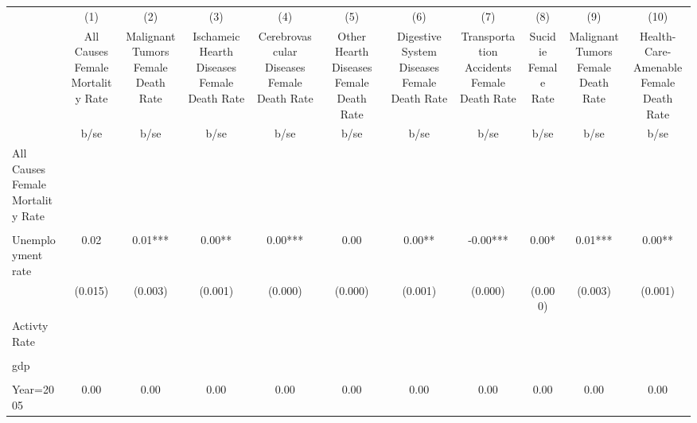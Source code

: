 {
\def\sym#1{\ifmmode^{#1}\else\(^{#1}\)\fi}
\begin{tabular}{l*{10}{c}}
\hline\hline
                    &\multicolumn{1}{c}{(1)}&\multicolumn{1}{c}{(2)}&\multicolumn{1}{c}{(3)}&\multicolumn{1}{c}{(4)}&\multicolumn{1}{c}{(5)}&\multicolumn{1}{c}{(6)}&\multicolumn{1}{c}{(7)}&\multicolumn{1}{c}{(8)}&\multicolumn{1}{c}{(9)}&\multicolumn{1}{c}{(10)}\\
                    &\multicolumn{1}{c}{All Causes Female Mortality Rate}&\multicolumn{1}{c}{Malignant Tumors Female Death Rate}&\multicolumn{1}{c}{Ischameic Hearth Diseases Female Death Rate}&\multicolumn{1}{c}{Cerebrovascular Diseases Female Death Rate}&\multicolumn{1}{c}{Other Hearth Diseases Female Death Rate}&\multicolumn{1}{c}{Digestive System Diseases Female Death Rate}&\multicolumn{1}{c}{Transportation Accidents Female Death Rate}&\multicolumn{1}{c}{Sucidie Female Rate}&\multicolumn{1}{c}{Malignant Tumors Female Death Rate}&\multicolumn{1}{c}{Health-Care-Amenable Female Death Rate}\\
                    &  b/se   &  b/se   &  b/se   &  b/se   &  b/se   &  b/se   &  b/se   &  b/se   &  b/se   &  b/se   \\
\hline
All Causes Female Mortality Rate&         &         &         &         &         &         &         &         &         &         \\
                    &         &         &         &         &         &         &         &         &         &         \\
Unemployment rate   &  0.02   &  0.01***&  0.00** &  0.00***&  0.00   &  0.00** & -0.00***&  0.00*  &  0.01***&  0.00** \\
                    &(0.015)   &(0.003)   &(0.001)   &(0.000)   &(0.000)   &(0.001)   &(0.000)   &(0.000)   &(0.003)   &(0.001)   \\
Activty Rate        &         &         &         &         &         &         &         &         &         &         \\
                    &         &         &         &         &         &         &         &         &         &         \\
gdp                 &         &         &         &         &         &         &         &         &         &         \\
                    &         &         &         &         &         &         &         &         &         &         \\
Year=2005           &  0.00   &  0.00   &  0.00   &  0.00   &  0.00   &  0.00   &  0.00   &  0.00   &  0.00   &  0.00   \\

\end{tabular}}
